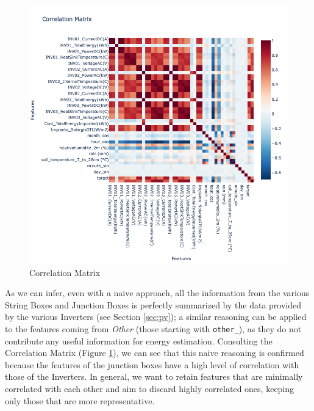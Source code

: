 \begin{figure}[H]
	\centering
	\includegraphics[width=\textwidth, keepaspectratio]{chapters/2_data_preprocessing/imgs/correlationmatrix.png}
	\caption{Correlation Matrix} %
	\label{fig:corrmatrix}
\end{figure}
As we can infer, even with a naive approach, all the information from the various
String Boxes and Junction Boxes is perfectly summarized by the data provided by the
various Inverters (see Section \ref{sec:pv}); a similar reasoning can be applied to the features
coming from \textit{Other} (those starting with \verb|other_|), as they do not contribute any
useful information for energy estimation. Consulting the Correlation Matrix (Figure \ref{fig:corrmatrix}), we can
see that this naive reasoning is confirmed because the features of the junction boxes
have a high level of correlation with those of the Inverters.
In general, we want to retain features that are minimally correlated with each other
and aim to discard highly correlated ones, keeping only those that are more representative.

